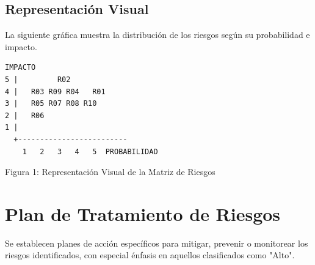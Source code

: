 \subsection{Representación Visual}
La siguiente gráfica muestra la distribución de los riesgos según su probabilidad e impacto.

\begin{center}
    \begin{verbatim}
IMPACTO
5 |         R02
4 |   R03 R09 R04   R01
3 |   R05 R07 R08 R10
2 |   R06
1 |
  +-------------------------
    1   2   3   4   5  PROBABILIDAD
    \end{verbatim}
    Figura 1: Representación Visual de la Matriz de Riesgos
\end{center}

\section{Plan de Tratamiento de Riesgos}
Se establecen planes de acción específicos para mitigar, prevenir o monitorear los riesgos identificados, con especial énfasis en aquellos clasificados como "Alto".

